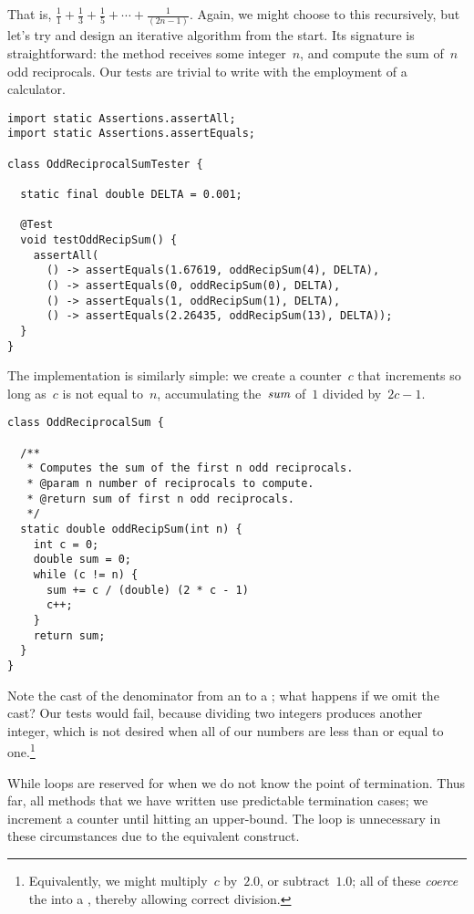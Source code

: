 That is, $\frac{1}{1} + \frac{1}{3} + \frac{1}{5} + \cdots + \frac{1}{(2n-1)}$. 
Again, we might choose to this recursively, but let's try and design an iterative algorithm from the start.
Its signature is straightforward: the method receives some integer~$n$, and compute the sum of~$n$ odd reciprocals. 
Our tests are trivial to write with the employment of a calculator.

\enlargethispage{-1\baselineskip}
\begin{lstlisting}[language=MyJava]
import static Assertions.assertAll;
import static Assertions.assertEquals;

class OddReciprocalSumTester {

  static final double DELTA = 0.001;

  @Test
  void testOddRecipSum() {
    assertAll(
      () -> assertEquals(1.67619, oddRecipSum(4), DELTA),
      () -> assertEquals(0, oddRecipSum(0), DELTA),
      () -> assertEquals(1, oddRecipSum(1), DELTA),
      () -> assertEquals(2.26435, oddRecipSum(13), DELTA));
  }
}
\end{lstlisting}

The implementation is similarly simple: we create a counter~$c$ that increments so long as~$c$ is not equal to~$n$, accumulating the~$\emph{sum}$ of~$1$ divided by~$2c-1$.

\newpage %
\begin{lstlisting}[language=MyJava]
class OddReciprocalSum {

  /**
   * Computes the sum of the first n odd reciprocals.
   * @param n number of reciprocals to compute.
   * @return sum of first n odd reciprocals.
   */
  static double oddRecipSum(int n) {
    int c = 0;
    double sum = 0;
    while (c != n) {
      sum += c / (double) (2 * c - 1)
      c++;
    }
    return sum;
  }
}
\end{lstlisting}

Note the cast of the denominator from an  to a ; what happens if we omit the cast? 
Our tests would fail, because dividing two integers produces another integer, which is not desired when all of our numbers are less than or equal to one.\footnote{Equivalently, we might multiply~$c$ by~$2.0$, or subtract~$1.0$; all of these \emph{coerce} the  into a , thereby allowing correct division.}

While loops are reserved for when we do not know the point of termination. 
Thus far, all methods that we have written use predictable termination cases; we increment a counter until hitting an upper-bound. 
The  loop is unnecessary in these circumstances due to the equivalent  construct.

